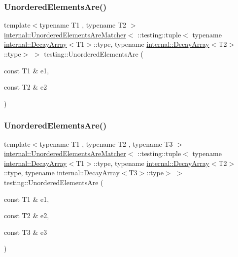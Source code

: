 \mbox{\label{namespacetesting_aedcecfa2107e03f5e2837f7124f73a87}} 
\subsubsection{\texorpdfstring{Unordered\+Elements\+Are()}{UnorderedElementsAre()}\hspace{0.1cm}{\footnotesize\ttfamily [3/11]}}
{\footnotesize\ttfamily template$<$typename T1 , typename T2 $>$ \\
\hyperlink{classtesting_1_1internal_1_1_unordered_elements_are_matcher}{internal\+::\+Unordered\+Elements\+Are\+Matcher}$<$ \+::testing\+::tuple$<$ typename \hyperlink{structtesting_1_1internal_1_1_decay_array}{internal\+::\+Decay\+Array}$<$T1$>$\+::type, typename \hyperlink{structtesting_1_1internal_1_1_decay_array}{internal\+::\+Decay\+Array}$<$T2$>$\+::type$>$ $>$ testing\+::\+Unordered\+Elements\+Are (\begin{DoxyParamCaption}\item[{const T1 \&}]{e1,  }\item[{const T2 \&}]{e2 }\end{DoxyParamCaption})\hspace{0.3cm}{\ttfamily [inline]}}

\mbox{\label{namespacetesting_aec0f9ede2dc05de791c61eae0504a757}} 
\subsubsection{\texorpdfstring{Unordered\+Elements\+Are()}{UnorderedElementsAre()}\hspace{0.1cm}{\footnotesize\ttfamily [4/11]}}
{\footnotesize\ttfamily template$<$typename T1 , typename T2 , typename T3 $>$ \\
\hyperlink{classtesting_1_1internal_1_1_unordered_elements_are_matcher}{internal\+::\+Unordered\+Elements\+Are\+Matcher}$<$ \+::testing\+::tuple$<$ typename \hyperlink{structtesting_1_1internal_1_1_decay_array}{internal\+::\+Decay\+Array}$<$T1$>$\+::type, typename \hyperlink{structtesting_1_1internal_1_1_decay_array}{internal\+::\+Decay\+Array}$<$T2$>$\+::type, typename \hyperlink{structtesting_1_1internal_1_1_decay_array}{internal\+::\+Decay\+Array}$<$T3$>$\+::type$>$ $>$ testing\+::\+Unordered\+Elements\+Are (\begin{DoxyParamCaption}\item[{const T1 \&}]{e1,  }\item[{const T2 \&}]{e2,  }\item[{const T3 \&}]{e3 }\end{DoxyParamCaption})\hspace{0.3cm}{\ttfamily [inline]}}

